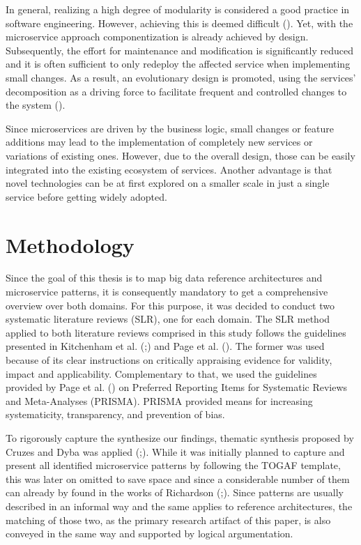 \documentclass[conference]{IEEEtran}
\begin{document}
In general, realizing a high degree of modularity is considered a good practice in software engineering. However, achieving this is deemed difficult (\cite{Faitelson.2018}). Yet, with the microservice approach componentization is already achieved by design. Subsequently, the effort for maintenance and modification is significantly reduced and it is often sufficient to only redeploy the affected service when implementing small changes. As a result, an evolutionary design is promoted, using the services’ decomposition as a driving force to facilitate frequent and controlled changes to the system (\cite{Krylovskiy}).

Since microservices are driven by the business logic, small changes or feature additions may lead to the implementation of completely new services or variations of existing ones. However, due to the overall design, those can be easily integrated into the existing ecosystem of services. Another advantage is that novel technologies can be at first explored on a smaller scale in just a single service before getting widely adopted.

\section{Methodology}

Since the goal of this thesis is to map big data reference architectures and microservice patterns, it is consequently mandatory to get a comprehensive overview over both domains. For this purpose, it was decided to conduct two systematic literature reviews (SLR), one for each domain.
The SLR method applied to both literature reviews comprised in this study follows the guidelines presented in Kitchenham et al. (\cite{Kitchenham.2004};) and Page et al. (\cite{Page.2021}). The former was used because of its clear instructions on critically appraising evidence for validity, impact and applicability. Complementary to that, we used the guidelines provided by Page et al. (\cite{Page.2021}) on Preferred Reporting Items for Systematic Reviews and Meta-Analyses (PRISMA). PRISMA provided means for increasing systematicity, transparency, and prevention of bias.

To rigorously capture the synthesize our findings, thematic synthesis proposed by Cruzes and Dyba was applied (\cite{Cruzes.2011};). While it was initially planned to capture and present all identified microservice patterns by following the TOGAF template, this was later on omitted to save space and since a considerable number of them can already by found in the works of Richardson (\cite{Richardson.2022};). Since patterns are usually described in an informal way and the same applies to reference architectures, the matching of those two, as the primary research artifact of this paper, is also conveyed in the same way and supported by logical argumentation.
\end{document}
